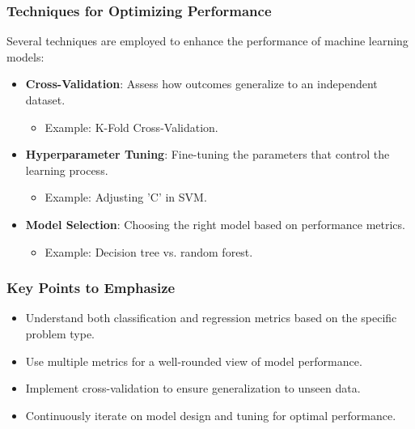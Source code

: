 \documentclass[aspectratio=169]{beamer}
\begin{document}
\begin{frame}
    \frametitle{Techniques for Optimizing Performance}
    Several techniques are employed to enhance the performance of machine learning models:
    
    \begin{itemize}
        \item \textbf{Cross-Validation}: Assess how outcomes generalize to an independent dataset. 
        \begin{itemize}
            \item Example: K-Fold Cross-Validation.
        \end{itemize}
        
        \item \textbf{Hyperparameter Tuning}: Fine-tuning the parameters that control the learning process.
        \begin{itemize}
            \item Example: Adjusting 'C' in SVM.
        \end{itemize}
        
        \item \textbf{Model Selection}: Choosing the right model based on performance metrics.
        \begin{itemize}
            \item Example: Decision tree vs. random forest.
        \end{itemize}
    \end{itemize}
\end{frame}

\begin{frame}
    \frametitle{Key Points to Emphasize}
    \begin{itemize}
        \item Understand both classification and regression metrics based on the specific problem type.
        \item Use multiple metrics for a well-rounded view of model performance.
        \item Implement cross-validation to ensure generalization to unseen data.
        \item Continuously iterate on model design and tuning for optimal performance.
    \end{itemize}
\end{frame}
\end{document}
